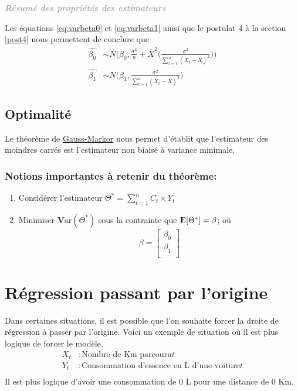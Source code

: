 \documentclass[11pt,french]{report}
\newcommand{\E}{{\rm I\kern-.3em E}}
\newcommand{\Var}{\mathrm{\textbf{V}ar}}
\newenvironment{moreInfo}[1]
	{\begin{mdframed}
	\textcolor{darkgray}{\huge \raisebox{-3.5pt}{\faInfo} 
	\hspace{0.5cm} \large\bfseries #1}\\[5pt]
	\normalsize
	\makebox[0.1\textwidth][l]{}	
	\begin{minipage}{10cm}}
	{	\end{minipage}
	\end{mdframed}}
\begin{document}
\bigskip
\begin{moreInfo}{\color{Gray}\emph{Résumé des propriétés des estimateurs}
     \color{black}}
\label{res:estima}
	Les équations \ref{eq:varbeta0} et \ref{eq:varbeta1}  ainsi que le postulat 4 à la section \ref{post4} nous permettent de conclure que 
	\begin{align*}
	     \hat{\beta_0} &\sim N\Bigg(\beta_0, \frac{\sigma^2}{n}  + \overline{X}^2 \bigg(\frac{\sigma^2}{\displaystyle\sum_{t=1}^n (X_t - \overline{X})^2}\bigg)\Bigg) \\
	     \hat{\beta_1} &\sim N\Bigg(\beta_1, \frac{\sigma^2}{\displaystyle\sum_{t=1}^n(X_t - \overline{X})^2}\Bigg)
	\end{align*}

\end{moreInfo}
\bigskip

\subsection{Optimalité}
Le théorème de \href{https://fr.wikipedia.org/wiki/Théorème_de_Gauss-Markov}{Gauss-Markor} nous permet d'établit que l'estimateur des moindres carrés est l'estimateur non biaisé à variance minimale. 

\subsubsection*{Notions importantes à retenir du théorème:}
\begin{enumerate}
\item Considérer l'estimateur $\Theta^* = \displaystyle\sum_{t=1}^n C_t \times Y_t$
\item Minimiser $\Var(\Theta^*)$ sous la contrainte que $\E[\Theta^*] = \beta$; où
$$ \beta =
\begin{bmatrix}
  \beta_0 \\
  \beta_1 \\ 
\end{bmatrix} $$
\end{enumerate}

\section{Régression passant par l'origine}
Dans certaines situations, il est possible que l'on souhaite forcer la droite de régression à passer par l'origine.
Voici un exemple de situation où il est plus logique de forcer le modèle,
\begin{align*}
X_t &: \text{Nombre de Km parcouru} t \\
Y_t &: \text{Consommation d'essence en L d'une voiture} t\\
\end{align*}
Il est plus logique d'avoir une consommation de 0 L pour une distance de 0 Km.
\end{document}
